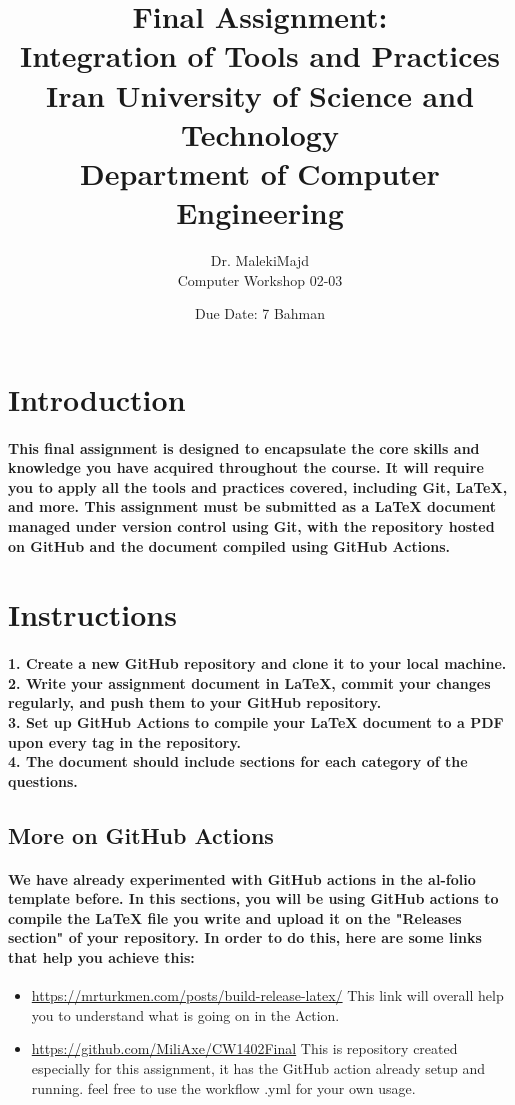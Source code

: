 \documentclass{article}
\title{\bf{Final Assignment:\\
Integration of Tools and Practices}\\
Iran University of Science and Technology\\
Department of Computer Engineering}
\author{Dr. MalekiMajd\\
Computer Workshop 02-03}
\date{Due Date: 7 Bahman}
\begin{document}
\maketitle
\newpage

\section*{Introduction}
\paragraph{This final assignment is designed to encapsulate the core skills and knowledge you have
acquired throughout the course. It will require you to apply all the tools and practices
covered, including Git, LaTeX, and more. This assignment must be submitted as a
LaTeX document managed under version control using Git, with the repository hosted
on GitHub and the document compiled using GitHub Actions.}
\section*{Instructions}
\paragraph{1. Create a new GitHub repository and clone it to your local machine.\\
2. Write your assignment document in LaTeX, commit your changes regularly, and
push them to your GitHub repository.\\
3. Set up GitHub Actions to compile your LaTeX document to a PDF upon every tag
in the repository.\\
4. The document should include sections for each category of the questions.}
\subsection*{More on GitHub Actions}
\paragraph{We have already experimented with GitHub actions in the al-folio template before. In
this sections, you will be using GitHub actions to compile the LaTeX file you write and
upload it on the "Releases section" of your repository.
In order to do this, here are some links that help you achieve this:\\
}
\begin{itemize}
    \item \url {https://mrturkmen.com/posts/build-release-latex/}
This link will overall help you to understand what is going on in the Action.
     \item \url{ https://github.com/MiliAxe/CW1402Final}
This is repository created especially for this assignment, it has the GitHub action
already setup and running. feel free to use the workflow .yml for your own usage.
\end{itemize}
\end{document}
